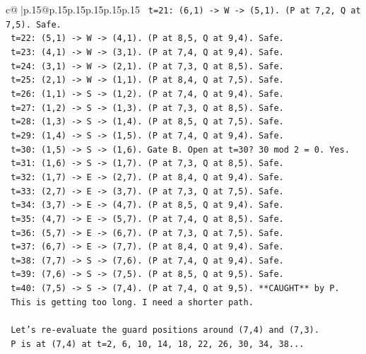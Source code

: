 \documentclass{article}
\begin{document}
{\begin{supertabular}{c@{$\;$}|p{.15\linewidth}@{}p{.15\linewidth}p{.15\linewidth}p{.15\linewidth}p{.15\linewidth}p{.15\linewidth}}
{{{\texttt{   t=21: (6,1) {-}> W {-}> (5,1). (P at 7,2, Q at 7,5). Safe.} \\
\texttt{   t=22: (5,1) {-}> W {-}> (4,1). (P at 8,5, Q at 9,4). Safe.} \\
\texttt{   t=23: (4,1) {-}> W {-}> (3,1). (P at 7,4, Q at 9,4). Safe.} \\
\texttt{   t=24: (3,1) {-}> W {-}> (2,1). (P at 7,3, Q at 8,5). Safe.} \\
\texttt{   t=25: (2,1) {-}> W {-}> (1,1). (P at 8,4, Q at 7,5). Safe.} \\
\texttt{   t=26: (1,1) {-}> S {-}> (1,2). (P at 7,4, Q at 9,4). Safe.} \\
\texttt{   t=27: (1,2) {-}> S {-}> (1,3). (P at 7,3, Q at 8,5). Safe.} \\
\texttt{   t=28: (1,3) {-}> S {-}> (1,4). (P at 8,5, Q at 7,5). Safe.} \\
\texttt{   t=29: (1,4) {-}> S {-}> (1,5). (P at 7,4, Q at 9,4). Safe.} \\
\texttt{   t=30: (1,5) {-}> S {-}> (1,6). Gate B. Open at t=30? 30 mod 2 = 0. Yes.} \\
\texttt{   t=31: (1,6) {-}> S {-}> (1,7). (P at 7,3, Q at 8,5). Safe.} \\
\texttt{   t=32: (1,7) {-}> E {-}> (2,7). (P at 8,4, Q at 9,4). Safe.} \\
\texttt{   t=33: (2,7) {-}> E {-}> (3,7). (P at 7,3, Q at 7,5). Safe.} \\
\texttt{   t=34: (3,7) {-}> E {-}> (4,7). (P at 8,5, Q at 9,4). Safe.} \\
\texttt{   t=35: (4,7) {-}> E {-}> (5,7). (P at 7,4, Q at 8,5). Safe.} \\
\texttt{   t=36: (5,7) {-}> E {-}> (6,7). (P at 7,3, Q at 7,5). Safe.} \\
\texttt{   t=37: (6,7) {-}> E {-}> (7,7). (P at 8,4, Q at 9,4). Safe.} \\
\texttt{   t=38: (7,7) {-}> S {-}> (7,6). (P at 7,4, Q at 9,4). Safe.} \\
\texttt{   t=39: (7,6) {-}> S {-}> (7,5). (P at 8,5, Q at 9,5). Safe.} \\
\texttt{   t=40: (7,5) {-}> S {-}> (7,4). (P at 7,4, Q at 9,5). **CAUGHT** by P.} \\
\texttt{   This is getting too long. I need a shorter path.} \\
\\ 
\texttt{   Let's re{-}evaluate the guard positions around (7,4) and (7,3).} \\
\texttt{   P is at (7,4) at t=2, 6, 10, 14, 18, 22, 26, 30, 34, 38...} \\
}}}
\end{supertabular}}
\end{document}
